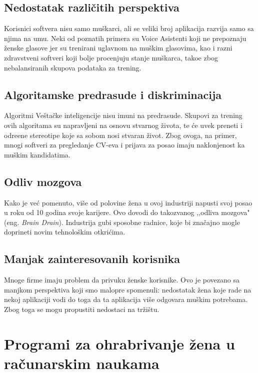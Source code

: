 \documentclass[12pt]{article}
\begin{document}
\subsection{Nedostatak različitih perspektiva}

Korisnici softvera nisu samo muškarci, ali se veliki broj aplikacija razvija samo sa njima na umu. Neki od poznatih primera su Voice Asistenti koji ne prepoznaju ženske glasove jer su trenirani uglavnom na muškim glasovima, kao i razni zdravstveni softveri koji bolje procenjuju stanje muškarca, tako\dj e zbog nebalansiranih skupova podataka za trening.

\subsection{Algoritamske predrasude i diskriminacija}

Algoritmi Veštačke inteligencije nisu imuni na predrasude. Skupovi za trening ovih algoritama su napravljeni na osnovu stvarnog života, te će uvek preneti i odre\dj ene stereotipe koje sa sobom nosi stvaran život. Zbog ovoga, na primer, mnogi softveri za pregledanje CV-eva i prijava za posao imaju naklonjenost ka muškim kandidatima.

\subsection{Odliv mozgova}

Kako je već pomenuto, više od polovine žena u ovoj industriji napusti svoj posao u roku od 10 godina svoje karijere. Ovo dovodi do takozvanog ,,odliva mozgova" (eng. \textit{Brain Drain}). Industrija gubi sposobne radnice, koje bi značajno mogle doprineti novim tehnološkim otkrićima.

\subsection{Manjak zainteresovanih korisnika}

Mnoge firme imaju problem da privuku ženske korisnike. Ovo je povezano sa manjkom perspektiva koji smo malopre spomenuli: nedostatak žena koje rade na nekoj aplikaciji vodi do toga da ta aplikacija više odgovara muškim potrebama. 
Zbog toga se mogu propustiti nedostaci na tržištu.


\newpage
\section{Programi za ohrabrivanje žena u računarskim naukama}
\end{document}
